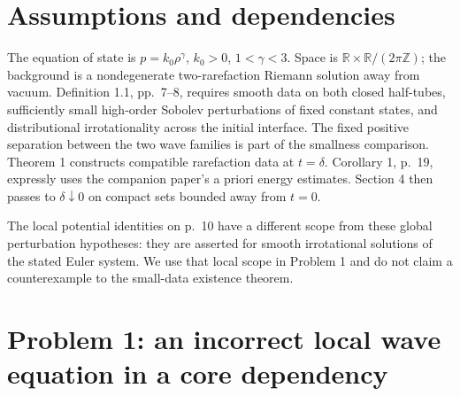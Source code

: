 \documentclass[10pt]{article}
\begin{document}
\section*{Assumptions and dependencies}
The equation of state is \(p=k_0\rho^\gamma\), \(k_0>0\), \(1<\gamma<3\). Space is \(\mathbb R\times\mathbb R/(2\pi\mathbb Z)\); the background is a nondegenerate two-rarefaction Riemann solution away from vacuum. Definition 1.1, pp. 7–8, requires smooth data on both closed half-tubes, sufficiently small high-order Sobolev perturbations of fixed constant states, and distributional irrotationality across the initial interface. The fixed positive separation between the two wave families is part of the smallness comparison. Theorem 1 constructs compatible rarefaction data at \(t=\delta\). Corollary 1, p. 19, expressly uses the companion paper’s a priori energy estimates. Section 4 then passes to \(\delta\downarrow0\) on compact sets bounded away from \(t=0\).\par
The local potential identities on p. 10 have a different scope from these global perturbation hypotheses: they are asserted for smooth irrotational solutions of the stated Euler system. We use that local scope in Problem 1 and do not claim a counterexample to the small-data existence theorem.\par
\section*{Problem 1: an incorrect local wave equation in a core dependency}
\end{document}
